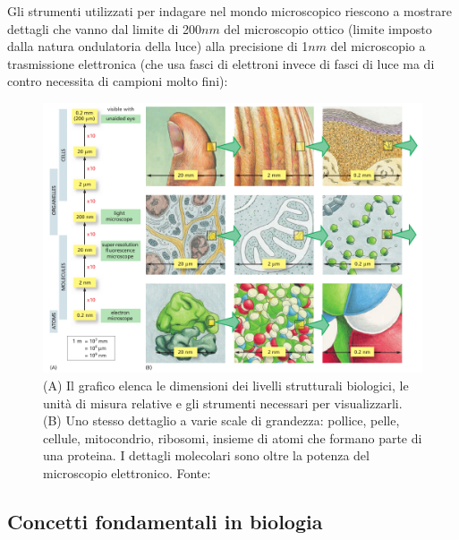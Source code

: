 \par Gli strumenti utilizzati per indagare nel mondo microscopico riescono a mostrare dettagli che vanno dal limite di 200$nm$ del microscopio ottico (limite imposto dalla natura ondulatoria della luce) alla precisione di 1$nm$ del microscopio a trasmissione elettronica (che usa fasci di elettroni invece di fasci di luce ma di contro necessita di campioni molto fini):

\begin{figure}[!h]
	\centering
	\includegraphics[scale=0.6]{images/grandezze.png}
	\caption{(A) Il grafico elenca le dimensioni dei livelli strutturali biologici, le unità di misura relative e gli strumenti necessari per visualizzarli. (B) Uno stesso dettaglio a varie scale di grandezza: pollice, pelle, cellule, mitocondrio, ribosomi, insieme di atomi che formano parte di una proteina. I dettagli molecolari sono oltre la potenza del microscopio elettronico. Fonte: \cite{alberts2018essential}}
	\label{fig:microscopi-grandezze}
\end{figure}

\subsection{Concetti fondamentali in biologia}

